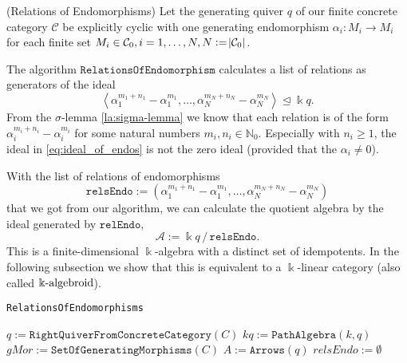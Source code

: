 \begin{remark}{(Relations of Endomorphisms)}
Let the generating quiver $q$ of our finite concrete category $\mathcal{C}$ be explicitly cyclic with one generating endomorphism
$\alpha_{i} : M_{i} \rightarrow M_{i}$ for each finite set $M_{i} \in \mathcal{C}_{0}, i = 1,\dots,N, N := \abs{\mathcal{C}_{0}}$.

The algorithm $\mathtt{RelationsOfEndomorphism}$ calculates a list of relations as generators of the ideal
\begin{equation}
\left< \alpha_{1}^{m_{1}+n_{1}} - \alpha_{1}^{m_{1}}, \dots, \alpha_{N}^{m_{N}+n_{N}} - \alpha_{N}^{m_{N}} \right>
\unlhd \Bbbk q. \label{eq:ideal_of_endos}
\end{equation}
From the $\sigma$-lemma \ref{la:sigma-lemma} we know that each relation is of the form $\alpha_{i}^{m_{i}+n_{i}} - \alpha_{i}^{m_{i}}$
for some natural numbers $m_{i}, n_{i} \in \mathbb{N}_{0}$. Especially with $n_{i} \geq 1$, the ideal in \eqref{eq:ideal_of_endos} is not the
zero ideal (provided that the $\alpha_{i} \neq 0$).

With the list of relations of endomorphisms
\[
\mathtt{relsEndo} := ( \alpha_{1}^{m_{1}+n_{1}} - \alpha_{1}^{m_{1}}, \dots, \alpha_{N}^{m_{N}+n_{N}} - \alpha_{N}^{m_{N}} )
\]
that we got from our algorithm, we can calculate the quotient algebra by the ideal generated by $\mathtt{relEndo}$,
\[
\mathcal{A} := \Bbbk q \, / \, \mathtt{relsEndo}.
\]
This is a finite-dimensional $\Bbbk$-algebra with a distinct set of idempotents.
In the following subsection we show that this is equivalent to a $\Bbbk$-linear category (also called $\Bbbk\textnormal{-}\mathrm{algebroid}$).
\end{remark}

\begin{algorithm}[H]\capstart
    \caption{\texttt{RelationsOfEndomorphisms}}\label{algo:RelationsOfEndomorphisms}
	\BlankLine
	$q := \mathtt{RightQuiverFromConcreteCategory}(C)$\;
	$kq := \mathtt{PathAlgebra}(k, q)$\;
	$gMor := \mathtt{SetOfGeneratingMorphisms}(C)$\;
	$A := \mathtt{Arrows}(q)$\;
	$relsEndo := \emptyset$\;
	\;
\end{algorithm}

